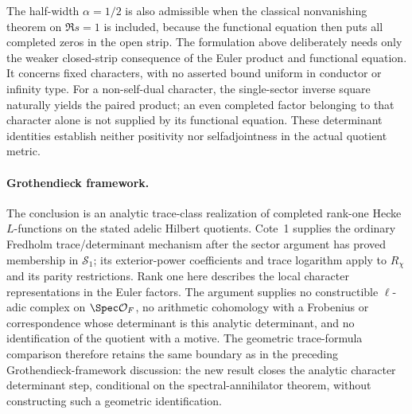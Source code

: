 The half-width $\alpha=1/2$ is also admissible when the classical nonvanishing theorem on $\Re s=1$ is included, because the functional equation then puts all completed zeros in the open strip. The formulation above deliberately needs only the weaker closed-strip consequence of the Euler product and functional equation. It concerns fixed characters, with no asserted bound uniform in conductor or infinity type. For a non-self-dual character, the single-sector inverse square naturally yields the paired product; an even completed factor belonging to that character alone is not supplied by its functional equation. These determinant identities establish neither positivity nor selfadjointness in the actual quotient metric.

\paragraph{Grothendieck framework.}
The conclusion is an analytic trace-class realization of completed rank-one Hecke $L$-functions on the stated adelic Hilbert quotients. Cote~1 supplies the ordinary Fredholm trace/determinant mechanism after the sector argument has proved membership in $\mathcal S_1$; its exterior-power coefficients and trace logarithm apply to $R_\chi$ and its parity restrictions. Rank one here describes the local character representations in the Euler factors. The argument supplies no constructible $\ell$-adic complex on $\Spec\mathcal O_F$, no arithmetic cohomology with a Frobenius or correspondence whose determinant is this analytic determinant, and no identification of the quotient with a motive. The geometric trace-formula comparison therefore retains the same boundary as in the preceding Grothendieck-framework discussion: the new result closes the analytic character determinant step, conditional on the spectral-annihilator theorem, without constructing such a geometric identification.

